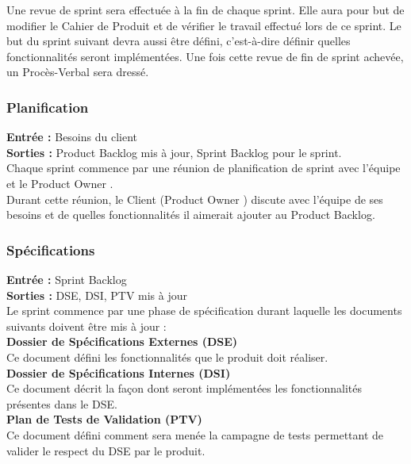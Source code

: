 Une revue de sprint sera effectuée à la fin de chaque sprint. Elle aura pour but de modifier le Cahier de Produit et de vérifier le travail effectué lors de ce sprint. Le but du sprint suivant devra aussi être défini, c’est-à-dire définir quelles fonctionnalités seront implémentées. Une fois cette revue de fin de sprint achevée, un Procès-Verbal sera dressé.



\subsubsection{Planification}

\textbf{Entrée :} Besoins du client \\
\textbf{Sorties :} Product Backlog mis à jour, Sprint Backlog pour le sprint.\\
Chaque sprint commence par une réunion de planification de sprint avec l’équipe et le Product Owner . \\
Durant cette réunion, le Client (Product Owner ) discute avec l’équipe de ses besoins et de quelles fonctionnalités il aimerait ajouter au Product Backlog. \\

\subsubsection{Spécifications}

\textbf{Entrée :} Sprint Backlog \\
\textbf{Sorties :} DSE, DSI, PTV mis à jour \\
Le sprint commence par une phase de spécification durant laquelle les documents suivants doivent être mis à jour : \\

\textbf{Dossier de Spécifications Externes (DSE)} \\
Ce document défini les fonctionnalités que le produit doit réaliser.\\

\textbf{Dossier de Spécifications Internes (DSI)} \\
Ce document décrit la façon dont seront implémentées les fonctionnalités présentes dans le DSE.\\
\textbf{Plan de Tests de Validation (PTV)} \\
Ce document défini comment sera menée la campagne de tests permettant de valider le respect du DSE par le produit. \\

